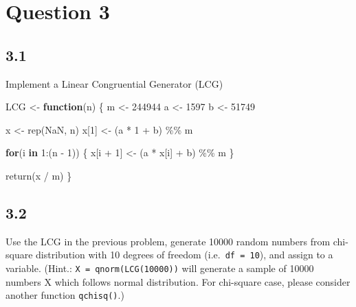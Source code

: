 \documentclass[
]{article}
\newenvironment{Shaded}{\begin{snugshade}}{\end{snugshade}}
\newcommand{\ConstantTok}[1]{\textcolor[rgb]{0.00,0.00,0.00}{#1}}
\newcommand{\ControlFlowTok}[1]{\textcolor[rgb]{0.13,0.29,0.53}{\textbf{#1}}}
\newcommand{\DecValTok}[1]{\textcolor[rgb]{0.00,0.00,0.81}{#1}}
\newcommand{\FunctionTok}[1]{\textcolor[rgb]{0.00,0.00,0.00}{#1}}
\newcommand{\NormalTok}[1]{#1}
\newcommand{\OtherTok}[1]{\textcolor[rgb]{0.56,0.35,0.01}{#1}}
\newcommand{\SpecialCharTok}[1]{\textcolor[rgb]{0.00,0.00,0.00}{#1}}
\begin{document}
\hypertarget{question-3}{%
\section{Question 3}\label{question-3}}

\hypertarget{section-6}{%
\subsection{3.1}\label{section-6}}

Implement a Linear Congruential Generator (LCG)

\begin{Shaded}
\begin{Highlighting}[]
\NormalTok{LCG }\OtherTok{\textless{}{-}} \ControlFlowTok{function}\NormalTok{(n) \{}
\NormalTok{  m }\OtherTok{\textless{}{-}} \DecValTok{244944}
\NormalTok{  a }\OtherTok{\textless{}{-}} \DecValTok{1597}
\NormalTok{  b }\OtherTok{\textless{}{-}} \DecValTok{51749}
  
\NormalTok{  x }\OtherTok{\textless{}{-}} \FunctionTok{rep}\NormalTok{(}\ConstantTok{NaN}\NormalTok{, n)}
\NormalTok{  x[}\DecValTok{1}\NormalTok{] }\OtherTok{\textless{}{-}}\NormalTok{ (a }\SpecialCharTok{*} \DecValTok{1} \SpecialCharTok{+}\NormalTok{ b) }\SpecialCharTok{\%\%}\NormalTok{ m}
  
  \ControlFlowTok{for}\NormalTok{(i }\ControlFlowTok{in} \DecValTok{1}\SpecialCharTok{:}\NormalTok{(n }\SpecialCharTok{{-}} \DecValTok{1}\NormalTok{)) \{}
\NormalTok{    x[i }\SpecialCharTok{+} \DecValTok{1}\NormalTok{] }\OtherTok{\textless{}{-}}\NormalTok{ (a }\SpecialCharTok{*}\NormalTok{ x[i] }\SpecialCharTok{+}\NormalTok{ b) }\SpecialCharTok{\%\%}\NormalTok{ m}
\NormalTok{  \}}
  
  \FunctionTok{return}\NormalTok{(x }\SpecialCharTok{/}\NormalTok{ m)}
\NormalTok{\}}
\end{Highlighting}
\end{Shaded}

\hypertarget{section-7}{%
\subsection{3.2}\label{section-7}}

Use the LCG in the previous problem, generate 10000 random numbers from
chi-square distribution with 10 degrees of freedom
(i.e.~\texttt{df\ =\ 10}), and assign to a variable. (Hint.:
\texttt{X\ =\ qnorm(LCG(10000))} will generate a sample of 10000 numbers
X which follows normal distribution. For chi-square case, please
consider another function \texttt{qchisq()}.)
\end{document}
